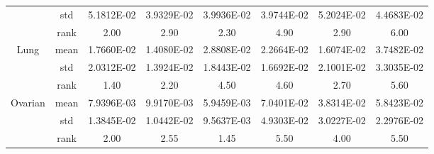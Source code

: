 \documentclass{wzuthesis}
\begin{document}
\begin{table}[htbp]
\begin{tabular}{cccccccc}
          & std   & 5.1812E-02 & 3.9329E-02 & 3.9936E-02 & 3.9744E-02 & 5.2024E-02 & 4.4683E-02 \\
          & rank  & 2.00  & 2.90  & 2.30  & 4.90  & 2.90  & 6.00 \\
    \multirow{3}[0]{*}{Lung} & mean  & 1.7660E-02 & 1.4080E-02 & 2.8808E-02 & 2.2664E-02 & 1.6074E-02 & 3.7482E-02 \\
          & std   & 2.0312E-02 & 1.3924E-02 & 1.8443E-02 & 1.6692E-02 & 2.1001E-02 & 3.3035E-02 \\
          & rank  & 1.40  & 2.20  & 4.50  & 4.60  & 2.70  & 5.60 \\
    \multirow{3}[1]{*}{Ovarian} & mean  & 7.9396E-03 & 9.9170E-03 & 5.9459E-03 & 7.0401E-02 & 3.8314E-02 & 5.8423E-02 \\
          & std   & 1.3845E-02 & 1.0442E-02 & 9.5637E-03 & 4.9303E-02 & 3.0227E-02 & 2.2976E-02 \\
          & rank  & 2.00  & 2.55  & 1.45  & 5.50  & 4.00  & 5.50 \\
    \bottomrule
    \end{tabular}%
  \label{tb:IHHO-fitness}%
\end{table}%
\end{document}
